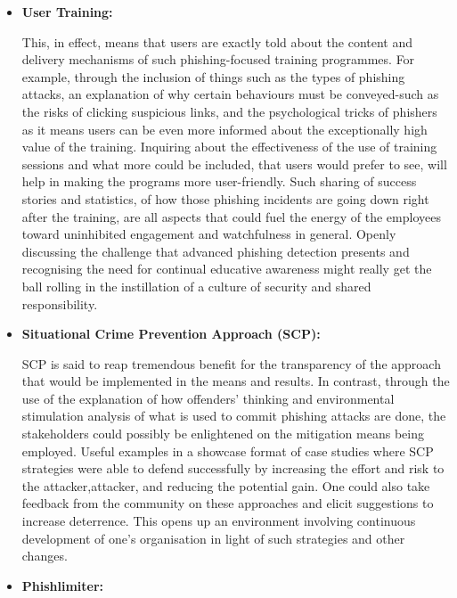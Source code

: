 \begin{itemize}
\item \textbf{User Training:}

This, in effect, means that users are exactly told about the content and delivery mechanisms of such phishing-focused training programmes. For example, through the inclusion of things such as the types of phishing attacks, an explanation of why certain behaviours must be conveyed-such as the risks of clicking suspicious links, and the psychological tricks of phishers as it means users can be even more informed about the exceptionally high value of the training. Inquiring about the effectiveness of the use of training sessions and what more could be included, that users would prefer to see, will help in making the programs more user-friendly. Such sharing of success stories and statistics, of how those phishing incidents are going down right after the training, are all aspects that could fuel the energy of the employees toward uninhibited engagement and watchfulness in general. Openly discussing the challenge that advanced phishing detection presents and recognising the need for continual educative awareness might really get the ball rolling in the instillation of a culture of security and shared responsibility.

\item \textbf{Situational Crime Prevention Approach (SCP):}

SCP is said to reap tremendous benefit for the transparency of the approach that would be implemented in the means and results. In contrast, through the use of the explanation of how offenders' thinking and environmental stimulation analysis of what is used to commit phishing attacks are done, the stakeholders could possibly be enlightened on the mitigation means being employed. Useful examples in a showcase format of case studies where SCP strategies were able to defend successfully by increasing the effort and risk to the attacker,attacker, and reducing the potential gain. One could also take feedback from the community on these approaches and elicit suggestions to increase deterrence. This opens up an environment involving continuous development of one's organisation in light of such strategies and other changes.

\item \textbf{Phishlimiter:}


\end{itemize}
